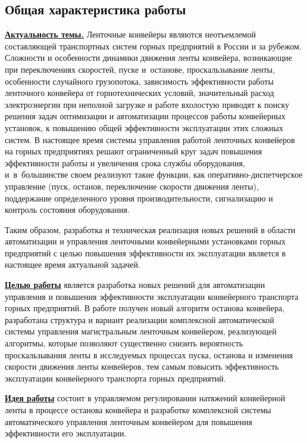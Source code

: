 \subsection*{\Large Общая характеристика работы}
\fontsize{14pt}{15pt}\selectfont
\underline{\textbf{Актуальность темы.}} Ленточные конвейеры являются неотъемлемой составляющей транспортных систем горных предприятий в России и за рубежом.
Сложности и особенности динамики движения ленты конвейера, возникающие при переключениях скоростей, пуске и~останове, проскальзывание ленты, особенности случайного грузопотока, зависимость эффективности работы ленточного конвейера от горнотехнических условий, значительный расход электроэнергии при неполной загрузке и работе вхолостую приводят к поиску решения задач оптимизации и автоматизации процессов работы конвейерных установок, к повышению общей эффективности эксплуатации этих сложных систем. В настоящее время системы управления работой ленточных конвейеров на горных предприятиях решают ограниченный круг задач повышения эффективности работы и увеличения срока службы оборудования, и~в~большинстве своем реализуют такие функции, как оперативно-диспетчерское управление (пуск, останов, переключение скорости движения ленты), поддержание определенного уровня производительности, сигнализацию и контроль состояния оборудования.

Таким образом, разработка и техническая реализация новых решений в области автоматизации и управления ленточными конвейерными установками горных предприятий с целью повышения эффективности их эксплуатации является в настоящее время актуальной задачей.
\bigskip

\underline{\textbf{Целью работы}} является разработка новых решений для автоматизации управления и повышения эффективности эксплуатации конвейерного транспорта горных предприятий. В работе получен новый алгоритм останова конвейера, разработана структура и вариант реализации комплексной автоматической системы управления магистральным ленточным конвейером, реализующей алгоритмы, которые позволяют существенно снизить вероятность проскальзывания ленты в исследуемых процессах пуска, останова и изменения скорости движения ленты конвейеров, тем самым повысить эффективность эксплуатации конвейерного транспорта горных предприятий.
\bigskip

\underline{\textbf{Идея работы}} состоит в управляемом регулировании натяжений конвейерной ленты в процессе останова конвейера и разработке комплексной системы автоматического управления ленточным конвейером для повышения эффективности его эксплуатации.
\bigskip

